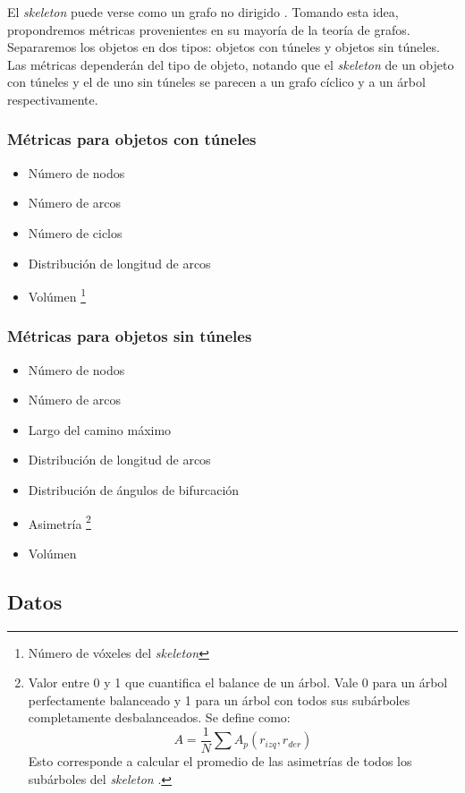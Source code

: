 El \textit{skeleton} puede verse como un grafo no dirigido \cite{bai2008path}. Tomando esta idea, propondremos métricas provenientes en su mayoría de la teoría de grafos. Separaremos los objetos en dos tipos: objetos con túneles \cite{svensson2003finding} y objetos sin túneles. Las métricas dependerán del tipo de objeto, notando que el \textit{skeleton} de un objeto con túneles y el de uno sin túneles se parecen a un grafo cíclico y a un árbol respectivamente.

\subsubsection{Métricas para objetos con túneles}

\begin{itemize}
\item Número de nodos
\item Número de arcos
\item Número de ciclos
\item Distribución de longitud de arcos
\item Volúmen \footnote{Número de vóxeles del \textit{skeleton}}
\end{itemize}

\subsubsection{Métricas para objetos sin túneles}

\begin{itemize}
\item Número de nodos
\item Número de arcos
\item Largo del camino máximo
\item Distribución de longitud de arcos
\item Distribución de ángulos de bifurcación
\item Asimetría \footnote{Valor entre 0 y 1 que cuantifica el balance de un árbol. Vale 0 para un árbol perfectamente balanceado y 1 para un árbol con todos sus subárboles completamente desbalanceados. Se define como:
\[
A = \frac{1}{N}\sum A_{p}(r_{izq},r_{der})
\]
Esto corresponde a calcular el promedio de las asimetrías de todos los subárboles del \textit{skeleton} \cite{van2004morphological}.}
\item Volúmen
\end{itemize}

\subsection{Datos}

